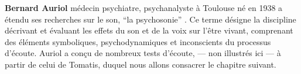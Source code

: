 
    \textbf{Bernard Auriol} médecin psychiatre,
   psychanalyste à Toulouse né en 1938
a étendu ses recherches sur le son, %
\enquote {la psychosonie} \autocite{auriol_stress}. Ce terme
désigne la discipline décrivant et évaluant les effets du
son et de la voix sur l'être vivant, comprenant des éléments
symboliques, psychodynamiques et inconscients du processus
d'écoute. Auriol a conçu de nombreux tests d'écoute, --- non illustrés ici --- à partir de celui de 
Tomatis,  
duquel nous allons consacrer le chapitre suivant.
